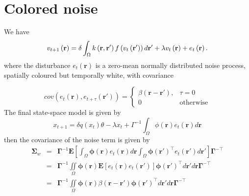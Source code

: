 \documentclass[onecolumn,draftcls]{IEEEtran}
\begin{document}
\section{Colored noise}
We have
\begin{equation}
v_{t + 1}\left( \mathbf{r} \right)  = \delta\int_\Omega  {k\left( {{\bf{r}} , {\bf{r'}}} \right)f\left( {{v_t}\left( \bf{r'} \right)} \right)d{\bf{r'}}} + \lambda v_t\left( {\bf{r}} \right) +e_t\left( {\mathbf{r}} \right).
\end{equation}
where the disturbance $e_t(\mathbf r)$ is a zero-mean normally distributed noise process, spatially coloured but temporally white, with covariance 

\begin{equation}
cov(e_t(\mathbf{r}),e_{t+\tau}(\mathbf{r'}))=
\begin{cases}
\beta\left(\mathbf{r}-\mathbf{r'}\right), & \tau=0 \\
0 & \mathrm{otherwise}
\end{cases}
\label{eq:FieldCovariance}
\end{equation}
The final state-space model is given by
\begin{equation}
x_{t + 1} = \delta q(x_t)\theta -\lambda x_t + \Gamma^{-1}\int_\Omega  {\phi ( \mathbf{r} )e_t( \mathbf{r} )d\mathbf{r}}
\end{equation}
then the covariance of the noise term is given by
\begin{eqnarray}
\mathbf \Sigma_w&{}={}&\mathbf{\Gamma}^{-1}\mathbf E[\int_{\Omega}\boldsymbol\phi\left(\mathbf r\right)e_t\left(\mathbf r\right)d\mathbf r\int_{\Omega}\boldsymbol\phi\left(\mathbf r'\right)^{\top}e_t\left(\mathbf r'\right)d\mathbf r']\mathbf{\Gamma}^{- \top} \nonumber \\
&=&\mathbf{\Gamma}^{-1}\iint\limits_{\Omega}\boldsymbol\phi\left(\mathbf r\right) \mathbf E[e_t\left(\mathbf r\right)e_t\left(\mathbf r'\right)]\boldsymbol\phi\left(\mathbf r'\right)^{\top}d\mathbf r' d\mathbf r\mathbf{\Gamma}^{- \top} \nonumber\\
&=&{}\mathbf{\Gamma}^{-1}\iint\limits_{\Omega}\boldsymbol\phi\left(\mathbf r\right) \beta\left(\mathbf r- \mathbf r' \right)\boldsymbol\phi\left(\mathbf r'\right)^{\top}d\mathbf r' d\mathbf r\mathbf{\Gamma}^{- \top} 
\end{eqnarray}
\end{document}
